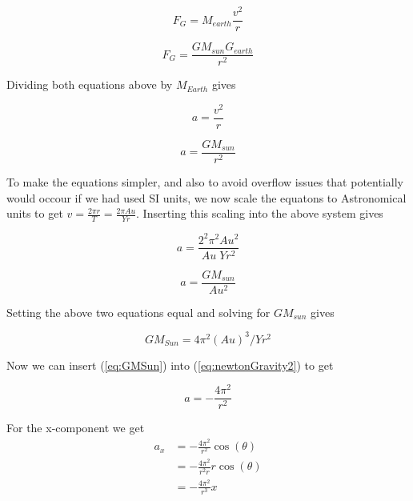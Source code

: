 \documentclass{article}
\begin{document}
\begin{equation}
F_G = M_{earth}\frac{v^2}{r}\label{eq:newtonCircle}
\end{equation}

\begin{equation}
F_G = \frac{GM_{sun}G_{earth}}{r^2}\label{eq:newtonGravity}
\end{equation}

Dividing both equations above by $M_{Earth}$ gives

\begin{equation}
a = \frac{v^2}{r}\label{eq:newtonCircle2}
\end{equation}

\begin{equation}
a = \frac{GM_{sun}}{r^2}\label{eq:newtonGravity2}
\end{equation}


To make the equations simpler, and also to avoid overflow issues that potentially would occour if we had used SI units, we now scale the equatons to Astronomical units to get $v = \frac{2\pi r}{T} = \frac{2\pi Au}{Yr}$. Inserting this scaling into the above system gives

\begin{equation}
a = \frac{2^2 \pi^2 Au^2}{Au\;Yr^2}\label{eq:newtonCircle3}
\end{equation}

\begin{equation}
a = \frac{GM_{sun}}{Au^2}\label{eq:newtonGravity3}
\end{equation}

Setting the above two equations equal and solving for $GM_{sun}$ gives

\begin{equation}\label{eq:GMSun}
GM_{Sun} = 4 \pi^2 (Au)^3/Yr^2
\end{equation}

Now we can insert (\ref{eq:GMSun}) into (\ref{eq:newtonGravity2}) to get

\begin{equation}
a = -\frac{4 \pi^2}{r^2}
\end{equation}

For the x-component we get
\begin{subequations}
	\begin{align}\label{eq:ax}
		a_x &= -\frac{4 \pi^2}{r^2} \cos(\theta)\\
		&= -\frac{4 \pi^2}{r^2 r} r\cos(\theta)\\
		&= -\frac{4 \pi^2}{r^3} x
	\end{align}
\end{subequations}
\end{document}
